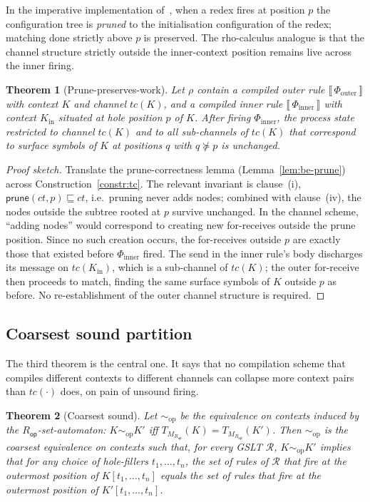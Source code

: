 \documentclass[11pt]{article}
\theoremstyle{plain}
\newtheorem{theorem}{Theorem}[section]
\theoremstyle{definition}
\theoremstyle{remark}
\newcommand{\sem}[1]{\llbracket\,#1\,\rrbracket}
\newcommand{\rop}{R_{\mathsf{op}}}
\begin{document}
In the imperative implementation of~\cite{BouwmanErkens2022}, when a redex
fires at position $p$ the configuration tree is \emph{pruned} to the
initialisation configuration of the redex; matching done strictly above $p$
is preserved. The rho-calculus analogue is that the channel structure
strictly outside the inner-context position remains live across the inner
firing.

\begin{theorem}[Prune-preserves-work]\label{thm:prune-preserves}
Let $\rho$ contain a compiled outer rule $\sem{\Phi_{\mathrm{outer}}}$ with
context $K$ and channel $tc(K)$, and a compiled inner rule
$\sem{\Phi_{\mathrm{inner}}}$ with context $K_{\mathrm{in}}$ situated at
hole position $p$ of $K$. After firing $\Phi_{\mathrm{inner}}$, the
process state restricted to channel $tc(K)$ and to all sub-channels of
$tc(K)$ that correspond to surface symbols of $K$ at positions $q$ with
$q \not\succeq p$ is unchanged.
\end{theorem}

\begin{proof}[Proof sketch]
Translate the prune-correctness lemma (Lemma~\ref{lem:be-prune}) across
Construction~\ref{constr:tc}. The relevant invariant is clause~(i),
$\mathsf{prune}(\mathit{ct}, p) \sqsubseteq \mathit{ct}$, i.e.\ pruning
never adds nodes; combined with clause~(iv), the nodes outside the
subtree rooted at $p$ survive unchanged. In the channel scheme,
``adding nodes'' would correspond to creating new for-receives outside
the prune position. Since no such creation occurs, the for-receives
outside $p$ are exactly those that existed before $\Phi_{\mathrm{inner}}$
fired. The send in the inner rule's body discharges its message on
$tc(K_{\mathrm{in}})$, which is a sub-channel of $tc(K)$; the outer
for-receive then proceeds to match, finding the same surface symbols
of $K$ outside $p$ as before. No re-establishment of the outer channel
structure is required.
\end{proof}

\subsection{Coarsest sound partition}

The third theorem is the central one. It says that no compilation scheme
that compiles different contexts to different channels can collapse more
context pairs than $tc(\cdot)$ does, on pain of unsound firing.

\begin{theorem}[Coarsest sound]\label{thm:coarsest}
Let $\sim_{\mathrm{op}}$ be the equivalence on contexts induced by the
$\rop$-set-automaton: $K \sim_{\mathrm{op}} K'$ iff
$T_{M_{\rop}}(K) = T_{M_{\rop}}(K')$. Then $\sim_{\mathrm{op}}$ is the
coarsest equivalence on contexts such that, for every GSLT $\mathcal{R}$,
$K \sim_{\mathrm{op}} K'$ implies that for any choice of hole-fillers
$t_{1}, \ldots, t_{n}$, the set of rules of $\mathcal{R}$ that fire at the
outermost position of $K[t_{1}, \ldots, t_{n}]$ equals the set of rules
that fire at the outermost position of $K'[t_{1}, \ldots, t_{n}]$.
\end{theorem}
\end{document}
